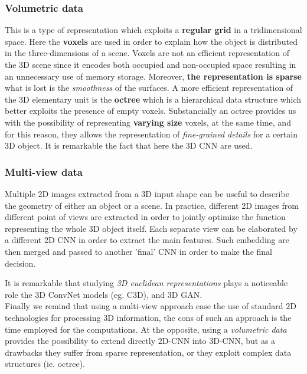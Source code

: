 \subsubsection{Volumetric data}
This is a type of representation which exploits a \textbf{regular grid} in a tridimensional space. Here the \textbf{voxels} are used in order to explain how the object is distributed in the three-dimensions of a scene. Voxels are not an efficient representation of the 3D scene since it encodes both occupied and non-occupied space resulting in an unnecessary use of memory storage. Moreover, \textbf{the representation is sparse} what is lost is the \textit{smoothness} of the surfaces. A more efficient representation of the 3D elementary unit is the \textbf{octree} which is a hierarchical data structure which better exploits the presence of empty voxels. Substancially an octree provides us with the possibility of representing \textbf{varying size} voxels, at the same time, and for this reason, they allows the representation of \textit{fine-grained details} for a certain 3D object. It is remarkable the fact that here the 3D CNN are used.

\subsubsection{Multi-view data}
Multiple 2D images extracted from a 3D input shape can be useful to describe the geometry of either an object or a scene. In practice, different 2D images from different point of views are extracted in order to jointly optimize the function representing the whole 3D object itself. Each separate view can be elaborated by a different 2D CNN in order to extract the main features. Such embedding are then merged and passed to another 'final' CNN in order to make the final decision.

\textsf{It is remarkable that studying \textit{3D euclidean representations} plays a noticeable role the 3D ConvNet models (eg. C3D), and 3D GAN.\\ Finally we remind that using a multi-view approach ease the use of standard 2D technologies for processing 3D information, the cons of such an approach is the time employed for the computations. At the opposite, using a \textit{volumetric data} provides the possibility to extend directly 2D-CNN into 3D-CNN, but as a drawbacks they suffer from sparse representation, or they exploit complex data structures (ie. octree)}. 

